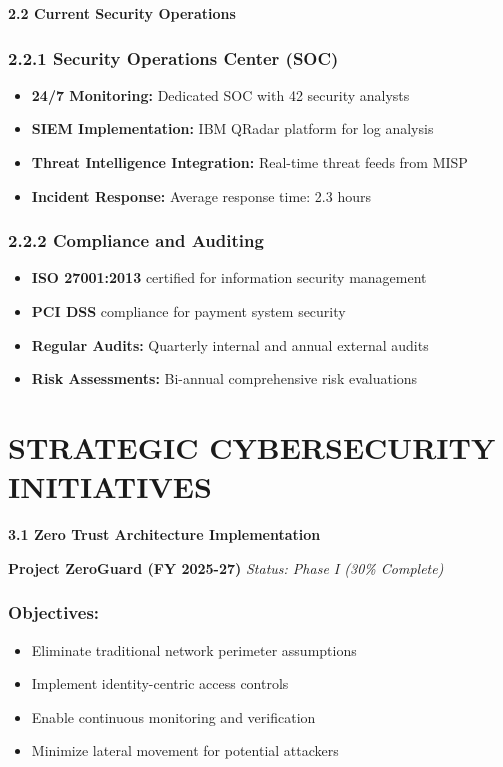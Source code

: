 \documentclass[12pt,a4paper]{report}
\newcommand{\sectionheader}[1]{\textbf{\color{govblue}#1}}
\newcommand{\initiative}[1]{\textbf{\color{secgreen}\ding{51} #1}}
\newcommand{\progress}[1]{\textit{#1}}
\begin{document}
\sectionheader{2.2 Current Security Operations}

\subsection*{2.2.1 Security Operations Center (SOC)}
\begin{itemize}[leftmargin=*, itemsep=3pt]
    \item \textbf{24/7 Monitoring:} Dedicated SOC with 42 security analysts
    \item \textbf{SIEM Implementation:} IBM QRadar platform for log analysis
    \item \textbf{Threat Intelligence Integration:} Real-time threat feeds from MISP
    \item \textbf{Incident Response:} Average response time: 2.3 hours
\end{itemize}

\subsection*{2.2.2 Compliance and Auditing}
\begin{itemize}[leftmargin=*, itemsep=3pt]
    \item \textbf{ISO 27001:2013} certified for information security management
    \item \textbf{PCI DSS} compliance for payment system security
    \item \textbf{Regular Audits:} Quarterly internal and annual external audits
    \item \textbf{Risk Assessments:} Bi-annual comprehensive risk evaluations
\end{itemize}

\chapter{STRATEGIC CYBERSECURITY INITIATIVES}

\sectionheader{3.1 Zero Trust Architecture Implementation}

\initiative{Project ZeroGuard (FY 2025-27)}
\progress{Status: Phase I (30\% Complete)}

\subsection*{Objectives:}
\begin{itemize}[leftmargin=*, itemsep=3pt]
    \item Eliminate traditional network perimeter assumptions
    \item Implement identity-centric access controls
    \item Enable continuous monitoring and verification
    \item Minimize lateral movement for potential attackers
\end{itemize}
\end{document}
